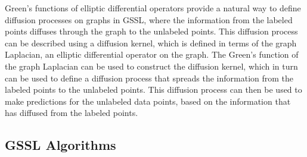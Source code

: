 \documentclass[12pt]{amsart}
\begin{document}
Green's functions of elliptic differential operators provide a natural way to define diffusion processes on graphs in GSSL, where the information from the labeled points diffuses through the graph to the unlabeled points. This diffusion process can be described using a diffusion kernel, which is defined in terms of the graph Laplacian, an elliptic differential operator on the graph. The Green's function of the graph Laplacian can be used to construct the diffusion kernel, which in turn can be used to define a diffusion process that spreads the information from the labeled points to the unlabeled points. This diffusion process can then be used to make predictions for the unlabeled data points, based on the information that has diffused from the labeled points.

\subsection{GSSL Algorithms}
\end{document}
